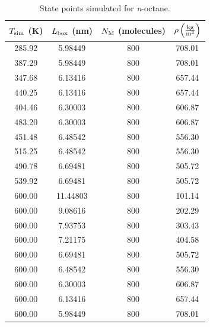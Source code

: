 \documentclass[journal=jctc,manuscript=article]{achemso}
\begin{document}
\begin{table}[p!]
	\caption{State points simulated for \textit{n}-octane.} \label{tab:C8H18 state points}
	\begin{center}
		\begin{tabular}{|c|c|c|c|}
			\hline
			$T_{\rm sim}$ (K) & $L_{\rm box}$ (nm) & $N_{\rm M}$ (molecules) & $\rho \left(\frac{\rm kg}{\rm m^3}\right)$ \\ \hline
			285.92 & 5.98449  & 800 & 708.01 \\
			387.29 & 5.98449  & 800 & 708.01 \\
			347.68 & 6.13416  & 800 & 657.44 \\
			440.25 & 6.13416  & 800 & 657.44 \\
			404.46 & 6.30003  & 800 & 606.87 \\
			483.20 & 6.30003  & 800 & 606.87 \\
			451.48 & 6.48542  & 800 & 556.30 \\
			515.25 & 6.48542  & 800 & 556.30 \\
			490.78 & 6.69481  & 800 & 505.72 \\
			539.92 & 6.69481  & 800 & 505.72 \\
			600.00 & 11.44803 & 800 & 101.14 \\
			600.00 & 9.08616  & 800 & 202.29 \\
			600.00 & 7.93753  & 800 & 303.43 \\
			600.00 & 7.21175  & 800 & 404.58 \\
			600.00 & 6.69481  & 800 & 505.72 \\
			600.00 & 6.48542  & 800 & 556.30 \\
			600.00 & 6.30003  & 800 & 606.87 \\
			600.00 & 6.13416  & 800 & 657.44 \\
			600.00 & 5.98449  & 800 & 708.01 \\
			\hline
		\end{tabular}
	\end{center}
\end{table}
\end{document}
